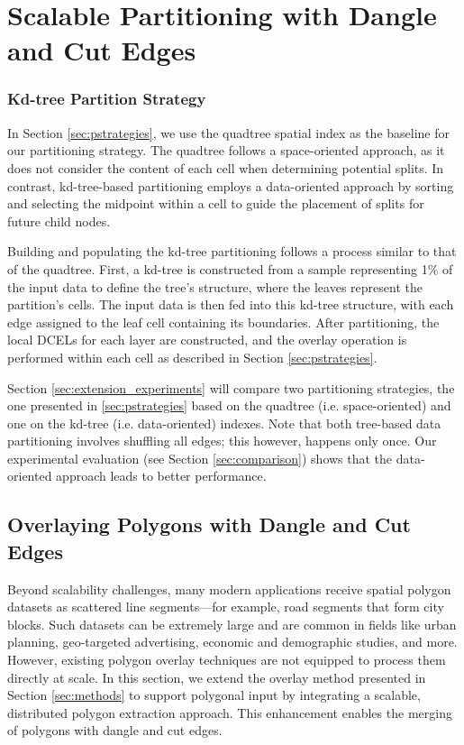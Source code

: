 \section{Scalable Partitioning with Dangle and Cut Edges} \label{sec:extension_methods}

\subsubsection{Kd-tree Partition Strategy} %
In Section \ref{sec:pstrategies}, we use the quadtree spatial index as the baseline for our partitioning strategy. The quadtree follows a space-oriented approach, as it does not consider the content of each cell when determining potential splits. In contrast, kd-tree-based partitioning employs a data-oriented approach by sorting and selecting the midpoint within a cell to guide the placement of splits for future child nodes.

Building and populating the kd-tree partitioning follows a process similar to that of the quadtree. First, a kd-tree is constructed from a sample representing 1\% of the input data to define the tree’s structure, where the leaves represent the partition’s cells. The input data is then fed into this kd-tree structure, with each edge assigned to the leaf cell containing its boundaries. After partitioning, the local DCELs for each layer are constructed, and the overlay operation is performed within each cell as described in Section \ref{sec:pstrategies}.

Section \ref{sec:extension_experiments} will compare two partitioning strategies, the one presented in \ref{sec:pstrategies} based on the quadtree (i.e. space-oriented) and one on the kd-tree (i.e. data-oriented) indexes.  Note that both tree-based data partitioning involves shuffling all edges; this however, happens only once. Our experimental evaluation (see Section \ref{sec:comparison}) shows that the data-oriented approach leads to better performance. 

\subsection{Overlaying Polygons with Dangle and Cut Edges} \label{sec:over_dang}

Beyond scalability challenges, many modern applications receive spatial polygon datasets as scattered line segments—for example, road segments that form city blocks. Such datasets can be extremely large and are common in fields like urban planning, geo-targeted advertising, economic and demographic studies, and more. However, existing polygon overlay techniques are not equipped to process them directly at scale. In this section, we extend the overlay method presented in Section \ref{sec:methods} to support polygonal input by integrating a scalable, distributed polygon extraction approach. This enhancement enables the merging of polygons with dangle and cut edges.

